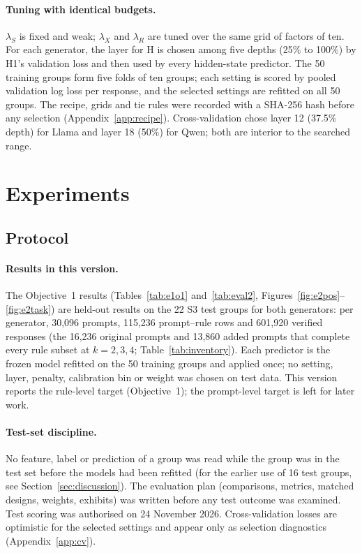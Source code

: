 \documentclass{article}
\newcommand{\blk}[1]{\textsf{#1}}
\begin{document}
\paragraph{Tuning with identical budgets.} $\lambda_S$ is fixed and weak; $\lambda_X$ and $\lambda_R$ are tuned over
the same grid of factors of ten. For each generator, the layer for \blk{H} is chosen among five depths (25\% to 100\%) by H1's validation loss and then
used by every hidden-state predictor. The 50 training groups form five folds of ten groups; each setting is scored by
pooled validation log loss per response, and the
selected settings are refitted on all 50 groups. The recipe, grids and tie rules were recorded with a SHA-256
hash before any selection (Appendix~\ref{app:recipe}). Cross-validation chose layer 12 (37.5\% depth) for Llama and layer 18 (50\%) for Qwen; both are interior
to the searched range.

\section{Experiments}
\label{sec:experiments}

\subsection{Protocol}

\paragraph{Results in this version.} The Objective~1 results (Tables~\ref{tab:e1o1} and~\ref{tab:eval2},
Figures~\ref{fig:e2pos}--\ref{fig:e2task}) are held-out results on the 22 S3 test groups for both generators: per
generator, 30,096 prompts, 115,236 prompt--rule rows and 601,920 verified responses (the 16,236 original prompts and
13,860 added prompts that complete every rule subset at $k=2,3,4$; Table~\ref{tab:inventory}). Each predictor is the
frozen model refitted on the 50 training groups and applied once; no setting, layer, penalty, calibration bin or weight
was chosen on test data. This version reports the rule-level target (Objective~1); the prompt-level target is left
for later work.

\paragraph{Test-set discipline.} No feature, label or prediction of a group was read while the group was in the test set
before the models had been refitted (for the earlier use of 16 test groups, see Section~\ref{sec:discussion}). The
evaluation plan (comparisons, metrics, matched designs, weights, exhibits) was written before any test outcome was
examined. Test scoring was authorised on 24 November 2026. Cross-validation losses are optimistic for the selected settings
\citep{cawley2010overfitting} and appear only as selection diagnostics (Appendix~\ref{app:cv}).
\end{document}
